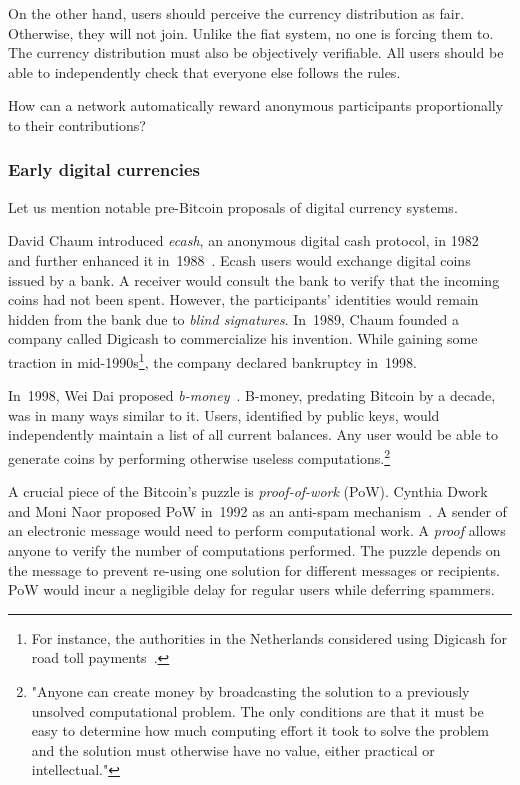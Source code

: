 On the other hand, users should perceive the currency distribution as fair.
Otherwise, they will not join.
Unlike the fiat system, no one is forcing them to.
The currency distribution must also be objectively verifiable.
All users should be able to independently check that everyone else follows the rules.

How can a network automatically reward anonymous participants proportionally to their contributions?


\subsubsection*{Early digital currencies}

Let us mention notable pre-Bitcoin proposals of digital currency systems.

David Chaum introduced \textit{ecash}, an anonymous digital cash protocol, in 1982~\cite{Chaum1982} and further enhanced it in~1988~\cite{Chaum1988}.
Ecash users would exchange digital coins issued by a bank.
A receiver would consult the bank to verify that the incoming coins had not been spent.
However, the participants' identities would remain hidden from the bank due to \textit{blind signatures}.
In~1989, Chaum founded a company called Digicash to commercialize his invention.
While gaining some traction in mid-1990s\footnote{For instance, the authorities in the Netherlands considered using Digicash for road toll payments~\cite{Chaum2019}.}, the company declared bankruptcy in~1998.

In~1998, Wei Dai proposed \textit{b-money}~\cite{Dai1998}.
B-money, predating Bitcoin by a decade, was in many ways similar to it.
Users, identified by public keys, would independently maintain a list of all current balances.
Any user would be able to generate coins by performing otherwise useless computations.\footnote{"Anyone can create money by broadcasting the solution to a previously unsolved computational problem. The only conditions are that it must be easy to determine how much computing effort it took to solve the problem and the solution must otherwise have no value, either practical or intellectual."}

A crucial piece of the Bitcoin's puzzle is \textit{proof-of-work} (PoW).
Cynthia Dwork and Moni Naor proposed PoW in~1992 as an anti-spam mechanism~\cite{Dwork1992}.
A sender of an electronic message would need to perform computational work.
A \textit{proof} allows anyone to verify the number of computations performed.
The puzzle depends on the message to prevent re-using one solution for different messages or recipients.
PoW would incur a negligible delay for regular users while deferring spammers.

